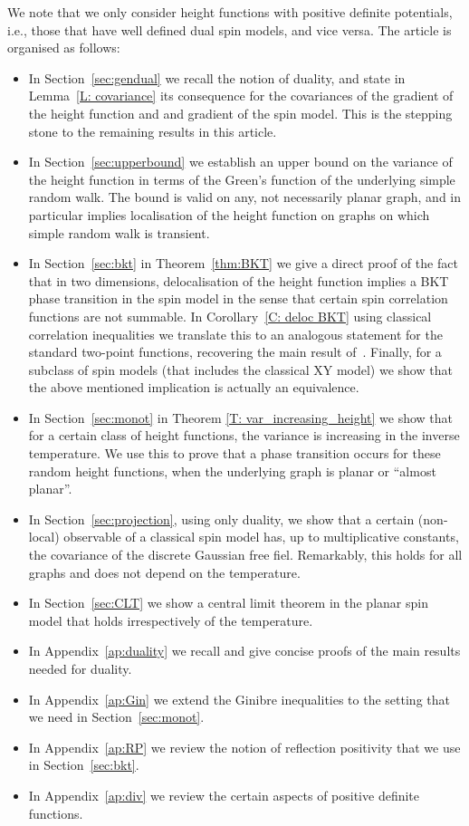 \documentclass[11pt, reqno]{amsart}
\numberwithin{equation}{section}
\theoremstyle{definition}
\theoremstyle{remark}
\begin{document}
We note that we only consider height functions with positive definite potentials, i.e., those that have well defined dual spin models, and vice versa.
The article is organised as follows:
 \begin{itemize}
 \item In Section~\ref{sec:gendual} we recall the notion of duality, and state in Lemma~\ref{L: covariance} its consequence for the covariances of the gradient of the height function and 
 and gradient of the spin model.
 This is the stepping stone to the remaining results in this article.
 \item In Section~\ref{sec:upperbound} we establish an upper bound on the variance of the height function in terms of the Green's function of the underlying simple random walk.
 The bound is valid on any, not necessarily planar graph, and in particular implies localisation of the height function on graphs on which simple random walk is transient.
 \item In Section~\ref{sec:bkt} in Theorem~\ref{thm:BKT} we give a direct proof of the fact that in two dimensions, delocalisation of the height function implies a BKT phase transition in the spin model in the sense that certain spin correlation functions are not summable. In Corollary~\ref{C: deloc BKT} using classical correlation inequalities we translate this to
 an analogous statement for the standard two-point functions, recovering the main result of~\cite{vEnLis}. Finally, for a subclass of spin models (that includes the classical XY model)
 we show that the above mentioned implication is actually an equivalence.
 \item In Section~\ref{sec:monot} in Theorem \ref{T: var_increasing_height} we show that for a certain class of height functions, the variance is increasing in the inverse temperature. 
 	We use this to prove that a phase transition occurs for these random height functions, when the underlying graph is planar or ``almost planar''. 
 \item In Section~\ref{sec:projection}, using only duality, we show that a certain (non-local) observable of a classical spin model has, up to multiplicative constants, the covariance of the discrete Gaussian free fiel. 
 	Remarkably, this holds for all graphs and does not depend on the temperature.
\item In Section~\ref{sec:CLT} we show a central limit theorem in the planar spin model that holds irrespectively of the temperature.
  \item In Appendix~\ref{ap:duality} we recall and give concise proofs of the main results needed for duality.
 \item In Appendix~\ref{ap:Gin} we extend the Ginibre inequalities to the setting that we need in Section~\ref{sec:monot}.
 \item In Appendix~\ref{ap:RP} we review the notion of reflection positivity that we use in Section~\ref{sec:bkt}.
  \item In Appendix~\ref{ap:div} we review the certain aspects of positive definite functions.
 \end{itemize}
 
\end{document}
